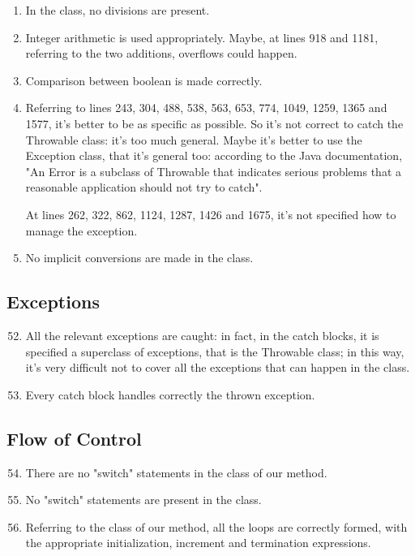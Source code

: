 \begin{enumerate}
\begin{itemize}
	    \end{itemize}
	\item In the class, no divisions are present.
	\item Integer arithmetic is used appropriately. Maybe, at lines 918 and 1181, referring to the two additions, overflows could happen.
	\item Comparison between boolean is made correctly.
	\item Referring to lines 243, 304, 488, 538, 563, 653, 774, 1049, 1259, 1365 and 1577, it's better to be as specific as possible. So it's not correct to catch the Throwable class: it's too much general. Maybe it's better to use the Exception class, that it's general too: according to the Java documentation, "An Error is a subclass of Throwable that indicates serious problems that a reasonable application should not try to catch". 
	
    At lines 262, 322, 862, 1124, 1287, 1426 and 1675, it's not specified how to manage the exception.
	\item No implicit conversions are made in the class.
\end{enumerate}
\subsection{Exceptions}
\begin{enumerate}
	\setcounter{enumi}{51}
	\item All the relevant exceptions are caught: in fact, in the catch blocks, it is specified a superclass of exceptions, that is the Throwable class; in this way, it's very difficult not to cover all the exceptions that can happen in the class.
	\item Every catch block handles correctly the thrown exception.
\end{enumerate}
\subsection{Flow of Control}
\begin{enumerate}
	\setcounter{enumi}{53}
	\item There are no "switch" statements in the class of our method.
	\item No "switch" statements are present in the class.
	\item Referring to the class of our method, all the loops are correctly formed, with the appropriate initialization, increment and termination expressions.
\end{enumerate}
